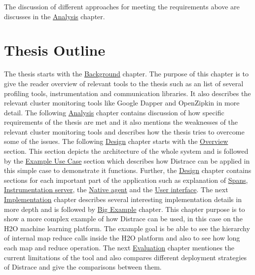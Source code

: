 The discussion of different approaches for meeting the requirements above are discusses in the \hyperref[analysis]{Analysis} chapter.

\section{Thesis Outline}
The thesis starts with the \hyperref[chap:background]{Background} chapter. The purpose of this chapter is to give the reader overview of relevant tools to the thesis such as an list of several profiling tools, instrumentation and communication libraries. It also describes the relevant cluster monitoring tools like Google Dapper and OpenZipkin in more detail. The following \hyperref[analysis]{Analysis} chapter contains discussion of how specific requirements of the thesis are met and it also mentions the weaknesses of the relevant cluster monitoring tools and describes how the thesis tries to overcome some of the issues. The following \hyperref[chap:design]{Design} chapter starts with the \hyperref[design:overview]{Overview} section. This section depicts the architecture of the whole system and is followed by the \hyperref[design:use_case]{Example Use Case} section which describes how Distrace can be applied in this simple case to demonstrate it functions. Further, the \hyperref[chap:design]{Design} chapter contains sections for each important part of the application such as explanation of \hyperref[subsec:spans]{Spans}, \hyperref[sec:inst_server]{Instrumentation server}, the \hyperref[native_agent_design]{Native agent} and the \hyperref[sec:zipkin_ui]{User interface}. The next \hyperref[chap:implementation]{Implementation} chapter describes several interesting implementation details in more depth and is followed by \hyperref[chap:big_example]{Big Example} chapter. This chapter purpose is to show a more complex example of how Distrace can be used, in this case on the H2O machine learning platform. The example goal is be able to see the hierarchy of internal map reduce calls inside the H2O platform and also to see how long each map and reduce operation. The next \hyperref[chap:evaluation]{Evaluation} chapter mentiones the current limitations of the tool and also compares different deployment strategies of Distrace and give the comparisons between them.
